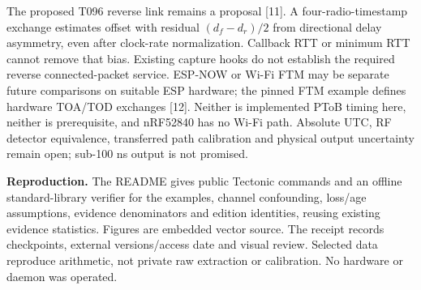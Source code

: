 \documentclass[11pt,letterpaper]{article}
\begin{document}
The proposed T096 reverse link remains a proposal [11]. A four-radio-timestamp exchange estimates offset with residual $(d_f-d_r)/2$ from directional delay asymmetry, even after clock-rate normalization. Callback RTT or minimum RTT cannot remove that bias. Existing capture hooks do not establish the required reverse connected-packet service. ESP-NOW or Wi-Fi FTM may be separate future comparisons on suitable ESP hardware; the pinned FTM example defines hardware TOA/TOD exchanges [12]. Neither is implemented PToB timing here, neither is prerequisite, and nRF52840 has no Wi-Fi path. Absolute UTC, RF detector equivalence, transferred path calibration and physical output uncertainty remain open; sub-100 ns output is not promised.

\textbf{Reproduction.} The README gives public Tectonic commands and an offline standard-library verifier for the examples, channel confounding, loss/age assumptions, evidence denominators and edition identities, reusing existing evidence statistics. Figures are embedded vector source. The receipt records checkpoints, external versions/access date and visual review. Selected data reproduce arithmetic, not private raw extraction or calibration. No hardware or daemon was operated.
\end{document}
